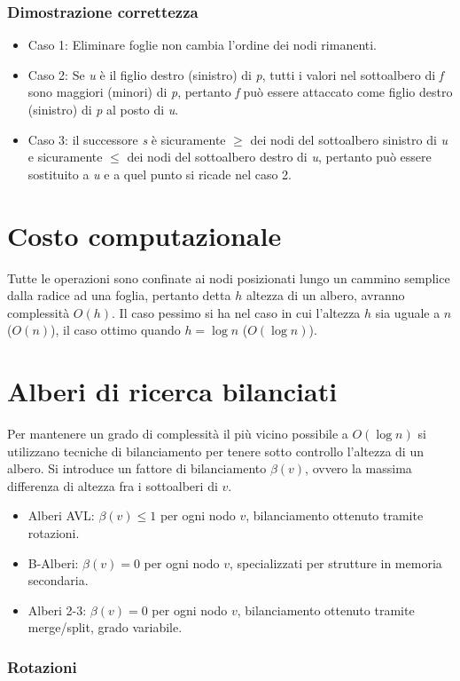 \subsubsection{Dimostrazione correttezza}
\begin{itemize}
\item Caso 1: Eliminare foglie non cambia l'ordine dei nodi rimanenti.
\item Caso 2: Se \emph{u} \`e il figlio destro (sinistro) di \emph{p}, tutti i valori nel sottoalbero di \emph{f} sono maggiori (minori) di \emph{p}, 
pertanto \emph{f} pu\`o essere attaccato come figlio destro (sinistro) di \emph{p} al posto di \emph{u}.
\item Caso 3: il successore \emph{s} \`e sicuramente $\ge$ dei nodi del sottoalbero sinistro di \emph{u} e sicuramente $\le$ dei nodi del sottoalbero destro 
di \emph{u}, pertanto pu\`o essere sostituito a \emph{u} e a quel punto si ricade nel caso 2.
\end{itemize}
\section{Costo computazionale}
Tutte le operazioni sono confinate ai nodi posizionati lungo un cammino semplice dalla radice ad una foglia, pertanto detta $h$ altezza di un albero, 
avranno complessit\`a $O(h)$. Il caso pessimo si ha nel caso in cui l'altezza $h$ sia uguale a $n$ ($O(n)$), il caso ottimo quando $h=\log n$ ($O(\log n)$).
\section{Alberi di ricerca bilanciati}
Per mantenere un grado di complessit\`a il pi\`u vicino possibile a $O(\log n)$ si utilizzano tecniche di bilanciamento per tenere sotto controllo l'altezza
di un albero. Si introduce un fattore di bilanciamento $\beta(v)$, ovvero la massima differenza di altezza fra i sottoalberi di $v$. 
\begin{itemize}
\item Alberi AVL: $\beta(v)\le 1$ per ogni nodo $v$, bilanciamento ottenuto tramite rotazioni.
\item B-Alberi: $\beta(v)=0$ per ogni nodo $v$, specializzati per strutture in memoria secondaria.
\item Alberi 2-3: $\beta(v)=0$ per ogni nodo $v$, bilanciamento ottenuto tramite merge/split, grado variabile.
\end{itemize}
\subsubsection{Rotazioni} 
